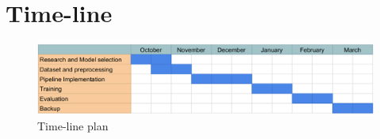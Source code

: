 \documentclass[11pt]{article}
\begin{document}
\section{Time-line}
\begin{figure}[h]
\centering
\includegraphics[width=\textwidth]{time-table.png}
\caption{Time-line plan}
\end{figure}



\end{document}
